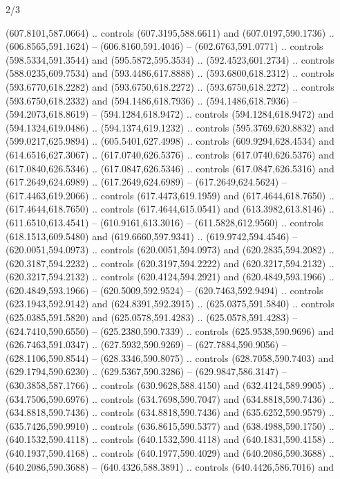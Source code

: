 \begin{flagdescription}{2/3}
\begin{scope}[xshift=0.5\flaglength,yshift=0.5\flagwidth,scale=\flagwidth/525.28]
\begin{scope}[y=0.1mm, x=0.1mm, yscale=-1,shift={(-381.5,-404)}]
\begin{scope}[shift={(5.25001,4.53053)},miter limit=4.00,line width=0.800\lw]
  (607.8101,587.0664) .. controls (607.3195,588.6611) and (607.0197,590.1736) ..
  (606.8565,591.1624) -- (606.8160,591.4046) -- (602.6763,591.0771) .. controls
  (598.5334,591.3544) and (595.5872,595.3534) .. (592.4523,601.2734) .. controls
  (588.0235,609.7534) and (593.4486,617.8888) .. (593.6800,618.2312) .. controls
  (593.6770,618.2282) and (593.6750,618.2272) .. (593.6750,618.2272) .. controls
  (593.6750,618.2332) and (594.1486,618.7936) .. (594.1486,618.7936) --
  (594.2073,618.8619) -- (594.1284,618.9472) .. controls (594.1284,618.9472) and
  (594.1324,619.0486) .. (594.1374,619.1232) .. controls (595.3769,620.8832) and
  (599.0217,625.9894) .. (605.5401,627.4998) .. controls (609.9294,628.4534) and
  (614.6516,627.3067) .. (617.0740,626.5376) .. controls (617.0740,626.5376) and
  (617.0840,626.5346) .. (617.0847,626.5346) .. controls (617.0847,626.5316) and
  (617.2649,624.6989) .. (617.2649,624.6989) -- (617.2649,624.5624) --
  (617.4463,619.2066) .. controls (617.4473,619.1959) and (617.4644,618.7650) ..
  (617.4644,618.7650) .. controls (617.4644,615.0541) and (613.3982,613.8146) ..
  (611.6510,613.4541) -- (610.9161,613.3016) -- (611.5828,612.9560) .. controls
  (618.1513,609.5480) and (619.6660,597.9341) .. (619.9742,594.4546) --
  (620.0051,594.0973) .. controls (620.0051,594.0973) and (620.2835,594.2082) ..
  (620.3187,594.2232) .. controls (620.3197,594.2222) and (620.3217,594.2132) ..
  (620.3217,594.2132) .. controls (620.4124,594.2921) and (620.4849,593.1966) ..
  (620.4849,593.1966) -- (620.5009,592.9524) -- (620.7463,592.9494) .. controls
  (623.1943,592.9142) and (624.8391,592.3915) .. (625.0375,591.5840) .. controls
  (625.0385,591.5820) and (625.0578,591.4283) .. (625.0578,591.4283) --
  (624.7410,590.6550) -- (625.2380,590.7339) .. controls (625.9538,590.9696) and
  (626.7463,591.0347) .. (627.5932,590.9269) -- (627.7884,590.9056) --
  (628.1106,590.8544) -- (628.3346,590.8075) .. controls (628.7058,590.7403) and
  (629.1794,590.6230) .. (629.5367,590.3286) -- (629.9847,586.3147) --
  (630.3858,587.1766) .. controls (630.9628,588.4150) and (632.4124,589.9905) ..
  (634.7506,590.6976) .. controls (634.7698,590.7047) and (634.8818,590.7436) ..
  (634.8818,590.7436) .. controls (634.8818,590.7436) and (635.6252,590.9579) ..
  (635.7426,590.9910) .. controls (636.8615,590.5377) and (638.4988,590.1750) ..
  (640.1532,590.4118) .. controls (640.1532,590.4118) and (640.1831,590.4158) ..
  (640.1937,590.4168) .. controls (640.1977,590.4029) and (640.2086,590.3688) ..
  (640.2086,590.3688) -- (640.4326,588.3891) .. controls (640.4426,586.7016) and

\end{scope}
\end{scope}
\end{scope}
\end{flagdescription}
